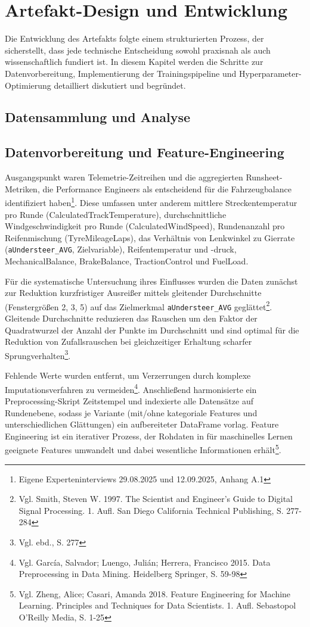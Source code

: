 \chapter{Artefakt-Design und Entwicklung}

Die Entwicklung des Artefakts folgte einem strukturierten Prozess, der sicherstellt, dass jede technische Entscheidung sowohl praxisnah als auch wissenschaftlich fundiert ist. In diesem Kapitel werden die Schritte zur Datenvorbereitung, Implementierung der Trainingspipeline und Hyperparameter-Optimierung detailliert diskutiert und begründet.

\section{Datensammlung und Analyse}

\section{Datenvorbereitung und Feature-Engineering}

Ausgangspunkt waren Telemetrie-Zeitreihen und die aggregierten Runsheet-Metriken, die Performance Engineers als entscheidend für die Fahrzeugbalance identifiziert haben\footnote{Eigene Experteninterviews 29.08.2025 und 12.09.2025, Anhang A.1}. Diese umfassen unter anderem mittlere Streckentemperatur pro Runde (CalculatedTrackTemperature), durchschnittliche Windgeschwindigkeit pro Runde (CalculatedWindSpeed), Rundenanzahl pro Reifenmischung (TyreMileageLaps), das Verhältnis von Lenkwinkel zu Gierrate (\texttt{aUndersteer\_AVG}, Zielvariable), Reifentemperatur und -druck, MechanicalBalance, BrakeBalance, TractionControl und FuelLoad.

Für die systematische Untersuchung ihres Einflusses wurden die Daten zunächst zur Reduktion kurzfristiger Ausreißer mittels gleitender Durchschnitte (Fenstergrößen 2, 3, 5) auf das Zielmerkmal \texttt{aUndersteer\_AVG} geglättet\footnote{Vgl. Smith, Steven W. 1997. The Scientist and Engineer's Guide to Digital Signal Processing. 1. Aufl. San Diego California Technical Publishing, S. 277-284}. Gleitende Durchschnitte reduzieren das Rauschen um den Faktor der Quadratwurzel der Anzahl der Punkte im Durchschnitt und sind optimal für die Reduktion von Zufallsrauschen bei gleichzeitiger Erhaltung scharfer Sprungverhalten\footnote{Vgl. ebd., S. 277}. 

Fehlende Werte wurden entfernt, um Verzerrungen durch komplexe Imputationsverfahren zu vermeiden\footnote{Vgl. García, Salvador; Luengo, Julián; Herrera, Francisco 2015. Data Preprocessing in Data Mining. Heidelberg Springer, S. 59-98}. Anschließend harmonisierte ein Preprocessing-Skript Zeitstempel und indexierte alle Datensätze auf Rundenebene, sodass je Variante (mit/ohne kategoriale Features und unterschiedlichen Glättungen) ein aufbereiteter DataFrame vorlag. Feature Engineering ist ein iterativer Prozess, der Rohdaten in für maschinelles Lernen geeignete Features umwandelt und dabei wesentliche Informationen erhält\footnote{Vgl. Zheng, Alice; Casari, Amanda 2018. Feature Engineering for Machine Learning. Principles and Techniques for Data Scientists. 1. Aufl. Sebastopol O'Reilly Media, S. 1-25}.

